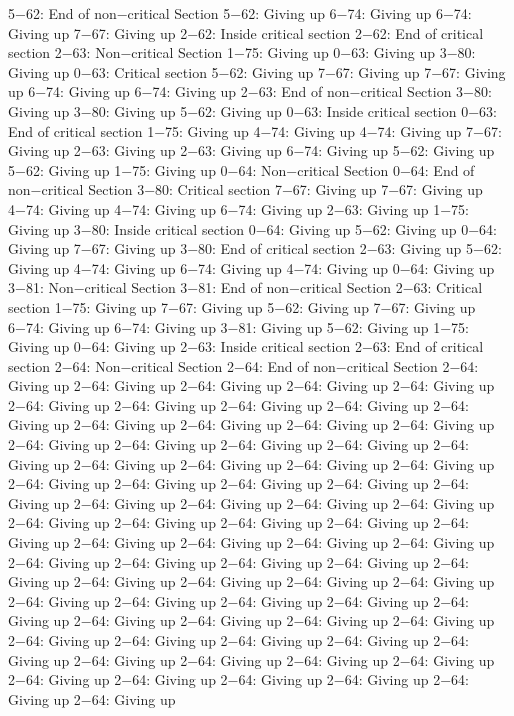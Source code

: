 5−62: End of non−critical Section
5−62: Giving up
6−74: Giving up
6−74: Giving up
7−67: Giving up
2−62: Inside critical section
2−62: End of critical section
2−63: Non−critical Section
1−75: Giving up
0−63: Giving up
3−80: Giving up
0−63: Critical section
5−62: Giving up
7−67: Giving up
7−67: Giving up
6−74: Giving up
6−74: Giving up
2−63: End of non−critical Section
3−80: Giving up
3−80: Giving up
5−62: Giving up
0−63: Inside critical section
0−63: End of critical section
1−75: Giving up
4−74: Giving up
4−74: Giving up
7−67: Giving up
2−63: Giving up
2−63: Giving up
6−74: Giving up
5−62: Giving up
5−62: Giving up
1−75: Giving up
0−64: Non−critical Section
0−64: End of non−critical Section
3−80: Critical section
7−67: Giving up
7−67: Giving up
4−74: Giving up
4−74: Giving up
6−74: Giving up
2−63: Giving up
1−75: Giving up
3−80: Inside critical section
0−64: Giving up
5−62: Giving up
0−64: Giving up
7−67: Giving up
3−80: End of critical section
2−63: Giving up
5−62: Giving up
4−74: Giving up
6−74: Giving up
4−74: Giving up
0−64: Giving up
3−81: Non−critical Section
3−81: End of non−critical Section
2−63: Critical section
1−75: Giving up
7−67: Giving up
5−62: Giving up
7−67: Giving up
6−74: Giving up
6−74: Giving up
3−81: Giving up
5−62: Giving up
1−75: Giving up
0−64: Giving up
2−63: Inside critical section
2−63: End of critical section
2−64: Non−critical Section
2−64: End of non−critical Section
2−64: Giving up
2−64: Giving up
2−64: Giving up
2−64: Giving up
2−64: Giving up
2−64: Giving up
2−64: Giving up
2−64: Giving up
2−64: Giving up
2−64: Giving up
2−64: Giving up
2−64: Giving up
2−64: Giving up
2−64: Giving up
2−64: Giving up
2−64: Giving up
2−64: Giving up
2−64: Giving up
2−64: Giving up
2−64: Giving up
2−64: Giving up
2−64: Giving up
2−64: Giving up
2−64: Giving up
2−64: Giving up
2−64: Giving up
2−64: Giving up
2−64: Giving up
2−64: Giving up
2−64: Giving up
2−64: Giving up
2−64: Giving up
2−64: Giving up
2−64: Giving up
2−64: Giving up
2−64: Giving up
2−64: Giving up
2−64: Giving up
2−64: Giving up
2−64: Giving up
2−64: Giving up
2−64: Giving up
2−64: Giving up
2−64: Giving up
2−64: Giving up
2−64: Giving up
2−64: Giving up
2−64: Giving up
2−64: Giving up
2−64: Giving up
2−64: Giving up
2−64: Giving up
2−64: Giving up
2−64: Giving up
2−64: Giving up
2−64: Giving up
2−64: Giving up
2−64: Giving up
2−64: Giving up
2−64: Giving up
2−64: Giving up
2−64: Giving up
2−64: Giving up
2−64: Giving up
2−64: Giving up
2−64: Giving up
2−64: Giving up
2−64: Giving up
2−64: Giving up
2−64: Giving up
2−64: Giving up
2−64: Giving up
2−64: Giving up
2−64: Giving up
